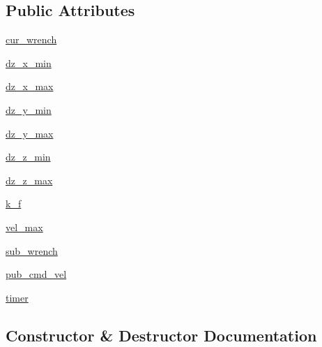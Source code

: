 \subsection*{Public Attributes}
\begin{DoxyCompactItemize}
\item 
\hyperlink{classadmittance__ctrl_1_1_admittance_ctrl_a3654d3f7f31c450d8cb010a4dadb3e18}{cur\+\_\+wrench}
\item 
\hyperlink{classadmittance__ctrl_1_1_admittance_ctrl_ae12abadbff515007a7857f4ad04a2068}{dz\+\_\+x\+\_\+min}
\item 
\hyperlink{classadmittance__ctrl_1_1_admittance_ctrl_a5f68a4404ad164497f0a5e57adc06ae5}{dz\+\_\+x\+\_\+max}
\item 
\hyperlink{classadmittance__ctrl_1_1_admittance_ctrl_a35e4e59c55a85d6dbc1f5ccfc5b87f25}{dz\+\_\+y\+\_\+min}
\item 
\hyperlink{classadmittance__ctrl_1_1_admittance_ctrl_af0acd0a0262fbcc79e90b8035e3197d6}{dz\+\_\+y\+\_\+max}
\item 
\hyperlink{classadmittance__ctrl_1_1_admittance_ctrl_a6c0fe2e42dde125b1e6f81814ce57c02}{dz\+\_\+z\+\_\+min}
\item 
\hyperlink{classadmittance__ctrl_1_1_admittance_ctrl_ab3d7954604431dd6244691fd54112420}{dz\+\_\+z\+\_\+max}
\item 
\hyperlink{classadmittance__ctrl_1_1_admittance_ctrl_a9a0d5d08a89a7cc49b27a9de9d44d8d6}{k\+\_\+f}
\item 
\hyperlink{classadmittance__ctrl_1_1_admittance_ctrl_a2d0c030242f05f5aed46ce03810d721a}{vel\+\_\+max}
\item 
\hyperlink{classadmittance__ctrl_1_1_admittance_ctrl_abcd3dae9bd287755d88fb6ab5621b66f}{sub\+\_\+wrench}
\item 
\hyperlink{classadmittance__ctrl_1_1_admittance_ctrl_a9e2e5b35def00bad6fc3fec2d80c63c4}{pub\+\_\+cmd\+\_\+vel}
\item 
\hyperlink{classadmittance__ctrl_1_1_admittance_ctrl_a83d7b0847cefa7749b3d4a9672c4d1c4}{timer}
\end{DoxyCompactItemize}


\subsection{Constructor \& Destructor Documentation}
